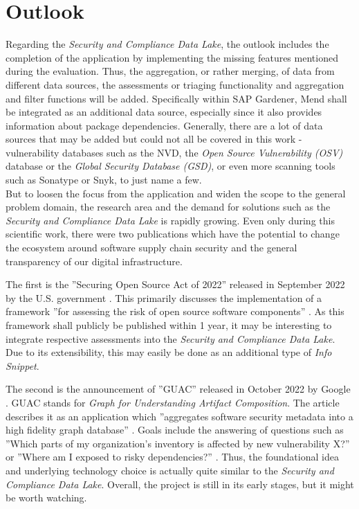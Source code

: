 \section{Outlook}
Regarding the \emph{Security and Compliance Data Lake}, the outlook includes the completion of the application by implementing the missing features mentioned during the evaluation. Thus, the aggregation, or rather merging, of data from different data sources, the assessments or triaging functionality and aggregation and filter functions will be added. Specifically within SAP Gardener, Mend shall be integrated as an additional data source, especially since it also provides information about package dependencies. Generally, there are a lot of data sources that may be added but could not all be covered in this work - vulnerability databases such as the NVD, the \emph{Open Source Vulnerability (OSV)} database or the \emph{Global Security Database (GSD)}, or even more scanning tools such as Sonatype or Snyk, to just name a few.\\
 
But to loosen the focus from the application and widen the scope to the general problem domain, the research area and the demand for solutions such as the \emph{Security and Compliance Data Lake} is rapidly growing. Even only during this scientific work, there were two publications which have the potential to change the ecosystem around software supply chain security and the general transparency of our digital infrastructure.\par
The first is the ''Securing Open Source Act of 2022'' released in September 2022 by the U.S. government \cite{SecuringOpenSourceAct}. This primarily discusses the implementation of a framework ''for assessing the risk of open source software components'' \cite{SecuringOpenSourceAct}. As this framework shall publicly be published within 1 year, it may be interesting to integrate respective assessments into the \emph{Security and Compliance Data Lake}. Due to its extensibility, this may easily be done as an additional type of \emph{Info Snippet}.\par
The second is the announcement of ''GUAC'' released in October 2022 by Google \cite{GUAC}. GUAC stands for \emph{Graph for Understanding Artifact Composition}. The article describes it as an application which ''aggregates software security metadata into a high fidelity graph database'' \cite{GUAC}. Goals include the answering of questions such as ''Which parts of my organization's inventory is affected by new vulnerability X?'' or ''Where am I exposed to risky dependencies?'' \cite{GUAC}. Thus, the foundational idea and underlying technology choice is actually quite similar to the \emph{Security and Compliance Data Lake}. Overall, the project is still in its early stages, but it might be worth watching.\\

